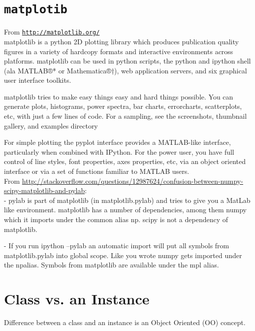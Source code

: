 \documentclass[11pt,a4paper]{article}
\begin{document}
\newpage
\section{{\tt matplotib}}
From \href{http://matplotlib.org/}{{\tt http://matplotlib.org/}} \\

matplotlib is a python 2D plotting library which produces publication
quality figures in a variety of hardcopy formats and interactive
environments across platforms. matplotlib can be used in python
scripts, the python and ipython shell (ala MATLAB®* or Mathematica®†),
web application servers, and six graphical user interface toolkits.


matplotlib tries to make easy things easy and hard things
possible. You can generate plots, histograms, power spectra, bar
charts, errorcharts, scatterplots, etc, with just a few lines of
code. For a sampling, see the screenshots, thumbnail gallery, and
examples directory

For simple plotting the pyplot interface provides a MATLAB-like
interface, particularly when combined with IPython. For the power
user, you have full control of line styles, font properties, axes
properties, etc, via an object oriented interface or via a set of
functions familiar to MATLAB users.\\

\smallskip
\smallskip
\noindent
From \href{http://stackoverflow.com/questions/12987624/confusion-between-numpy-scipy-matplotlib-and-pylab}{http://stackoverflow.com/questions/12987624/confusion-between-numpy-scipy-matplotlib-and-pylab}:\\

- pylab is part of matplotlib (in matplotlib.pylab) and tries to give
you a MatLab like environment. matplotlib has a number of
dependencies, among them numpy which it imports under the common alias
np. scipy is not a dependency of matplotlib.

- If you run ipython --pylab an automatic import will put all symbols
from matplotlib.pylab into global scope. Like you wrote numpy gets
imported under the npalias. Symbols from matplotlib are available
under the mpl alias.



\newpage
\section{Class vs. an Instance}
Difference between a class and an instance is an Object Oriented (OO)
concept.
\end{document}
